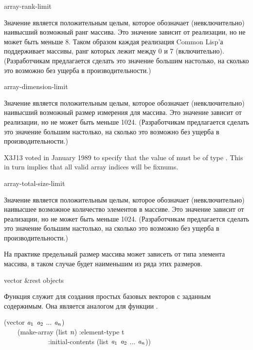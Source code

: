 \begin{defun}[Константа]
array-rank-limit

Значение  является положительным целым, которое обозначает
(невключительно) наивысший возможный ранг массива.
Это значение зависит от реализации, но не может быть меньше 8. Таком образом
каждая реализация Common Lisp'а поддерживает массивы, ранг которых лежит между 0
и 7 (включительно).
(Разработчикам предлагается сделать это значение большим настолько, на сколько
это возможно без ущерба в производительности.)
\end{defun}

\begin{defun}[Константа]
array-dimension-limit

Значение  является положительным целым, которое
обозначает (невключительно) наивысший возможный размер измерения для массива.
Это значение зависит от реализации, но не может быть меньше 1024.
(Разработчикам предлагается сделать это значение большим настолько, на сколько
это возможно без ущерба в производительности.)

\begin{new}
X3J13 voted in January 1989
to specify that the value
of  must be of type .
This in turn implies that all valid array indices will be fixnums.
\end{new}
\end{defun}

\begin{defun}[Константа]
array-total-size-limit

Значение  является положительным целым, которое
обозначает (невключительно) наивысшее возможное количество элементов в массиве.
Это значение зависит от реализации, но не может быть меньше 1024.
(Разработчикам предлагается сделать это значение большим настолько, на сколько
это возможно без ущерба в производительности.)

На практике предельный размер массива может зависеть от типа элемента массива, в
таком случае  будет наименьшим из ряда этих размеров.
\end{defun}

\begin{defun}[Функция]
vector &rest objects

Функция  служит для создания простых базовых векторов с заданным
содержимым.
Она является аналогом для функции .
\begin{lisp}
(vector $\emph{a}_1$ $\emph{a}_2$ ... $\emph{a}_{n}$) \\
~~~\EQ\ (make-array (list $\emph{n}$) :element-type t \\
~~~~~~~~~~~~~:initial-contents (list $\emph{a}_1$ $\emph{a}_2$ ... $\emph{a}_{n}$))
\end{lisp}
\end{defun}

